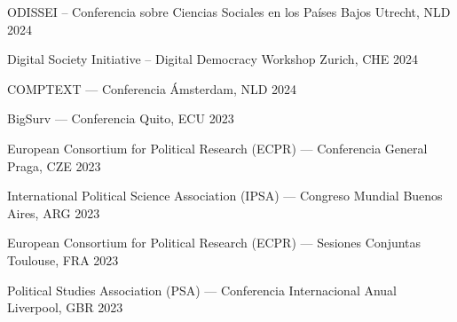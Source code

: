 \begin{cvhonors}
\cvconf
{ODISSEI -- Conferencia sobre Ciencias Sociales en los Países Bajos} 
{Utrecht, NLD}
{2024}
\end{cvhonors}

\begin{cvhonors}
\cvconf
{Digital Society Initiative -- Digital Democracy Workshop} 
{Zurich, CHE}
{2024}
\end{cvhonors}

\begin{cvhonors}
\cvconf
{COMPTEXT --- Conferencia} 
{Ámsterdam, NLD}
{2024}
\end{cvhonors}

\begin{cvhonors}
\cvconf
{BigSurv --- Conferencia} 
{Quito, ECU}
{2023}
\end{cvhonors}

\begin{cvhonors}
\cvconf
{European Consortium for Political Research (ECPR) --- Conferencia General} 
{Praga, CZE}
{2023}
\end{cvhonors}

\begin{cvhonors}
\cvconf
{International Political Science Association (IPSA) --- Congreso Mundial} 
{Buenos Aires, ARG}
{2023}
\end{cvhonors}



\begin{cvhonors}
\cvconf
{European Consortium for Political Research (ECPR) --- Sesiones Conjuntas} 
{Toulouse, FRA}
{2023}
\end{cvhonors}

\begin{cvhonors}
\cvconf
{Political Studies Association (PSA) --- Conferencia Internacional Anual} 
{Liverpool, GBR}
{2023}
\end{cvhonors}


